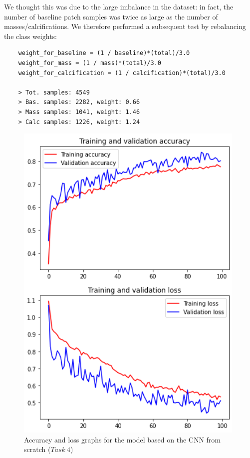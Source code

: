 \documentclass[11pt,a4paper,oneside]{article}
\begin{document}
We thought this was due to the large imbalance in the dataset: in fact, the number of baseline patch samples was twice as large as the number of masses/calcifications. We therefore performed a subsequent test by rebalancing the class weights:
\begin{verbatim}
    weight_for_baseline = (1 / baseline)*(total)/3.0 
    weight_for_mass = (1 / mass)*(total)/3.0
    weight_for_calcification = (1 / calcification)*(total)/3.0
    
    > Tot. samples: 4549
    > Bas. samples: 2282, weight: 0.66
    > Mass samples: 1041, weight: 1.46
    > Calc samples: 1226, weight: 1.24
\end{verbatim}

\begin{figure}[h]
\centering
	\begin{minipage}[c]{.4\textwidth}
		\centering\setlength{\captionmargin}{0pt}%
		\includegraphics[width=.9\textwidth]{images/4.1/2_acc}
		\caption{Accuracy and loss graphs for the model based on the CNN from scratch ($Task\ 4$)}

\end{minipage}
\end{figure}
\end{document}
